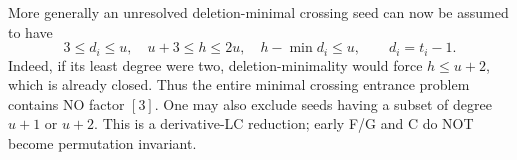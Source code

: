 More generally an unresolved deletion-minimal crossing seed can now
be assumed to have
\[
 3\le d_i\le u,\quad u+3\le h\le2u,\quad
 h-\min d_i\le u,\qquad d_i=t_i-1.
\]
Indeed, if its least degree were two, deletion-minimality would force
$h\le u+2$, which is already closed. Thus the entire minimal crossing
entrance problem contains NO factor $[3]$. One may also exclude seeds
having a subset of degree $u+1$ or $u+2$. This is a derivative-LC
reduction; early F/G and C do NOT become permutation invariant.
